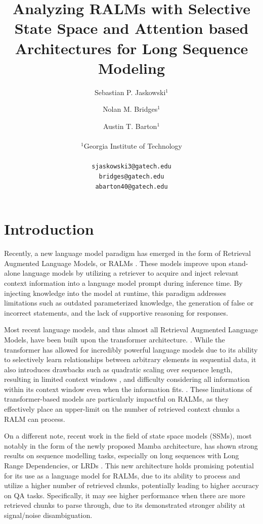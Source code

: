 \documentclass[11pt]{article}
\title{Analyzing RALMs with Selective State Space and Attention based Architectures for Long Sequence Modeling}
\author{Sebastian P. Jaskowski$^1$ \and Nolan M. Bridges$^1$ \and Austin T. Barton$^1$ \\
        \\
         $^1$Georgia Institute of Technology \\ 
         \\ 
         \texttt{sjaskowski3@gatech.edu} \\ \texttt{bridges@gatech.edu} \\
         \texttt{abarton40@gatech.edu} \\}
\begin{document}
\maketitle

\section{Introduction}
Recently, a new language model paradigm has emerged in the form of Retrieval Augmented Language Models, or RALMs \cite{lewis2021retrievalaugmented, gao2024retrievalaugmented}. These models improve upon stand-alone language models by utilizing a retriever to acquire and inject relevant context information into a language model prompt during inference time. By injecting knowledge into the model at runtime, this paradigm addresses limitations such as outdated parameterized knowledge, the generation of false or incorrect statements, and the lack of supportive reasoning for responses. 

Most recent language models, and thus almost all Retrieval Augmented Language Models, have been built upon the transformer architecture. \cite{vaswani2023attention}. While the transformer has allowed for incredibly powerful language models due to its ability to selectively learn relationships between arbitrary elements in sequential data, it also introduces drawbacks such as quadratic scaling over sequence length, resulting in limited context windows \cite{xu2024retrieval}, and difficulty considering all information within its context window even when the information fits. \cite{liu2023lost}. These limitations of transformer-based models are particularly impactful on RALMs, as they effectively place an upper-limit on the number of retrieved context chunks a RALM can process.

On a different note, recent work in the field of state space models (SSMs), most notably in the form of the newly proposed Mamba architecture, has shown strong results on sequence modelling tasks, especially on long sequences with Long Range Dependencies, or LRDs \cite{gu2022, gu2021combining}. This new architecture holds promising potential for its use as a language model for RALMs, due to its ability to process and utilize a higher number of retrieved chunks, potentially leading to higher accuracy on QA tasks. Specifically, it may see higher performance when there are more retrieved chunks to parse through, due to its demonstrated stronger ability at signal/noise disambiguation.
\end{document}
